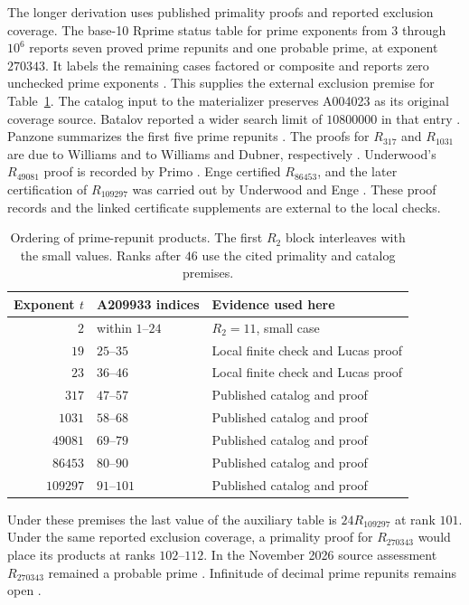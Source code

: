 \documentclass[11pt]{article}
\begin{document}
The longer derivation uses published primality proofs and reported
exclusion coverage. The base-10 Rprime status table for prime
exponents from \(3\) through \(10^6\) reports seven proved prime
repunits and one probable prime, at exponent \(270343\). It labels
the remaining cases factored or composite and reports zero unchecked
prime exponents \cite{rprime}. This supplies the external exclusion
premise for Table~\ref{tab:blocks}. The catalog input to the
materializer preserves A004023 as its original coverage source.
Batalov reported a wider search limit of \(10800000\) in that entry
\cite{oeis004023}. Panzone summarizes
the first five prime repunits \cite{panzone}. The proofs for
\(R_{317}\) and \(R_{1031}\) are due to Williams and to Williams
and Dubner, respectively \cite{williams317,williams}. Underwood's
\(R_{49081}\) proof is recorded by Primo \cite{primo}.
Enge certified \(R_{86453}\), and the later certification of
\(R_{109297}\) was carried out by Underwood and Enge
\cite{enge,enge109297,cm}. These proof records and the linked
certificate supplements are external to the local checks.

\begin{table}[htbp]
\centering
\begin{tabular}{@{}rll@{}}
\toprule
Exponent \(t\) & A209933 indices & Evidence used here\\
\midrule
\(2\)      & within \(1\)--\(24\) & \(R_2=11\), small case\\
\(19\)     & \(25\)--\(35\) & Local finite check and Lucas proof\\
\(23\)     & \(36\)--\(46\) & Local finite check and Lucas proof\\
\(317\)    & \(47\)--\(57\) & Published catalog and proof\\
\(1031\)   & \(58\)--\(68\) & Published catalog and proof\\
\(49081\)  & \(69\)--\(79\) & Published catalog and proof\\
\(86453\)  & \(80\)--\(90\) & Published catalog and proof\\
\(109297\) & \(91\)--\(101\) & Published catalog and proof\\
\bottomrule
\end{tabular}
\caption{Ordering of prime-repunit products. The first \(R_2\) block
interleaves with the small values. Ranks after \(46\) use the cited
primality and catalog premises.}
\label{tab:blocks}
\end{table}

Under these premises the last value of the auxiliary table is
\(24R_{109297}\) at rank \(101\). Under the same reported exclusion
coverage, a primality proof for \(R_{270343}\) would place its
products at ranks \(102\)--\(112\). In the November 2026 source
assessment \(R_{270343}\) remained a probable prime
\cite{oeis004023,rprime}. Infinitude of decimal prime repunits
remains open \cite{panzone}.
\end{document}
